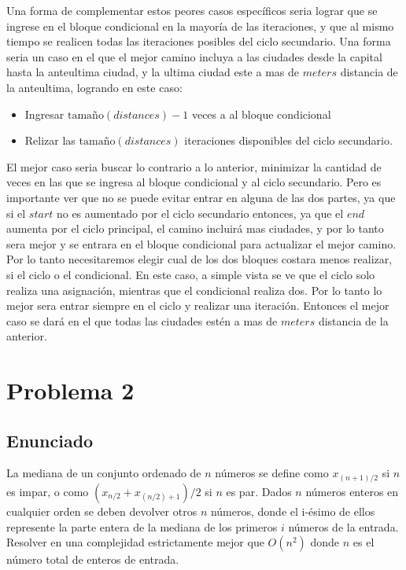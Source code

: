 \documentclass{article}
\theoremstyle{definition}
\theoremstyle{remark}
\begin{document}
Una forma de complementar estos peores casos específicos seria lograr que se ingrese en el bloque condicional en la mayoría de las iteraciones, y que al mismo tiempo se realicen todas las iteraciones posibles del ciclo secundario. Una forma seria un caso en el que el mejor camino incluya a las ciudades desde la capital hasta la anteultima ciudad, y la ultima ciudad este a mas de $meters$ distancia de la anteultima, logrando en este caso:
\begin{itemize}
\item Ingresar $\text{tamaño}(distances)-1$ veces a al bloque condicional
\item Relizar las $\text{tamaño}(distances)$ iteraciones disponibles del ciclo secundario.
\end{itemize}
\newline
El mejor caso seria buscar lo contrario a lo anterior, minimizar la cantidad de veces en las que se ingresa al bloque condicional y al ciclo secundario. Pero es importante ver que no se puede evitar entrar en alguna de las dos partes, ya que si el $start$ no es aumentado por el ciclo secundario entonces, ya que el $end$ aumenta por el ciclo principal, el camino incluirá mas ciudades, y por lo tanto sera mejor y se entrara en el bloque condicional para actualizar el mejor camino. Por lo tanto necesitaremos elegir cual de los dos bloques costara menos realizar, si el ciclo o el condicional. En este caso, a simple vista se ve que el ciclo solo realiza una asignación, mientras que el condicional realiza dos. Por lo tanto lo mejor sera entrar siempre en el ciclo y realizar una iteración. Entonces el mejor caso se dará en el que todas las ciudades estén a mas de $meters$ distancia de la anterior.

\section{Problema 2}

\subsection{Enunciado}

La mediana de un conjunto ordenado de $n$ números se define como $x_{(n+1)/2}$ si $n$ es impar, o como $(x_{n/2} + x_{(n/2)+1})/2$ si $n$ es par. Dados $n$ números enteros en cualquier orden se deben devolver otros $n$ números, donde el i-ésimo de ellos represente la parte entera de la mediana de los primeros $i$ números de la entrada.
Resolver en una complejidad estrictamente mejor que $O(n^2)$ donde $n$ es el número total de enteros de entrada.
\end{document}
